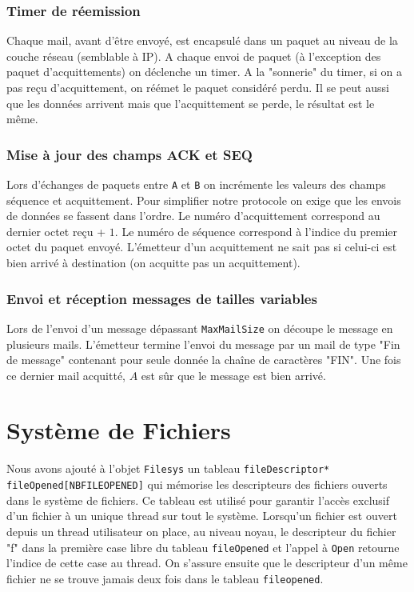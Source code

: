 \documentclass[11pt]{article}
\theoremstyle{definition}
\theoremstyle{definition}
\begin{document}
\subsubsection{Timer de réemission}
Chaque mail, avant d'être envoyé, est encapsulé dans un paquet au niveau de la couche réseau (semblable à IP). A chaque envoi de paquet (à l'exception des paquet d'acquittements) on déclenche un timer. A la "sonnerie" du timer, si on a pas reçu d'acquittement, on réémet le paquet considéré perdu. Il se peut aussi que les données arrivent mais que l'acquittement se perde, le résultat est le même. 

\subsubsection{Mise à jour des champs ACK et SEQ}
Lors d'échanges de paquets entre \texttt{A} et \texttt{B} on incrémente les valeurs des champs séquence et acquittement. Pour simplifier notre protocole on exige que les envois de données se fassent dans l'ordre. Le numéro d'acquittement correspond au dernier octet reçu + $1$. Le numéro de séquence correspond à l'indice du premier octet du paquet envoyé. L'émetteur d'un acquittement ne sait pas si celui-ci est bien arrivé à destination (on acquitte pas un acquittement). 

\subsubsection{ Envoi et réception messages de tailles variables}
Lors de l'envoi d'un message dépassant \texttt{MaxMailSize} on découpe le message en plusieurs mails.
L'émetteur termine l'envoi du message par un mail de type "Fin de message" contenant pour seule donnée
la chaîne de caractères "FIN". Une fois ce dernier mail acquitté, $A$ est sûr que le message est bien arrivé.

\section{Système de Fichiers}

Nous avons ajouté à l'objet \texttt{Filesys} un tableau \texttt{file}\hspace{0pt}\texttt{Descriptor*}\hspace{0pt}
\texttt{ file}\hspace{0pt}\texttt{Opened}\hspace{0pt}\texttt{[NBFILEOPENED]} qui mémorise les descripteurs des fichiers ouverts dans le système de fichiers. Ce tableau est utilisé pour garantir l'accès exclusif d'un fichier à un unique thread sur tout le système. Lorsqu'un fichier est ouvert depuis un thread utilisateur on place, au niveau noyau, le descripteur du fichier "f" dans la première case libre du tableau \texttt{fileOpened} et l'appel à \texttt{Open} retourne l'indice de cette case au thread. On s'assure ensuite que le descripteur d'un même fichier ne se trouve jamais deux fois dans le tableau
\texttt{fileopened}.
\end{document}
